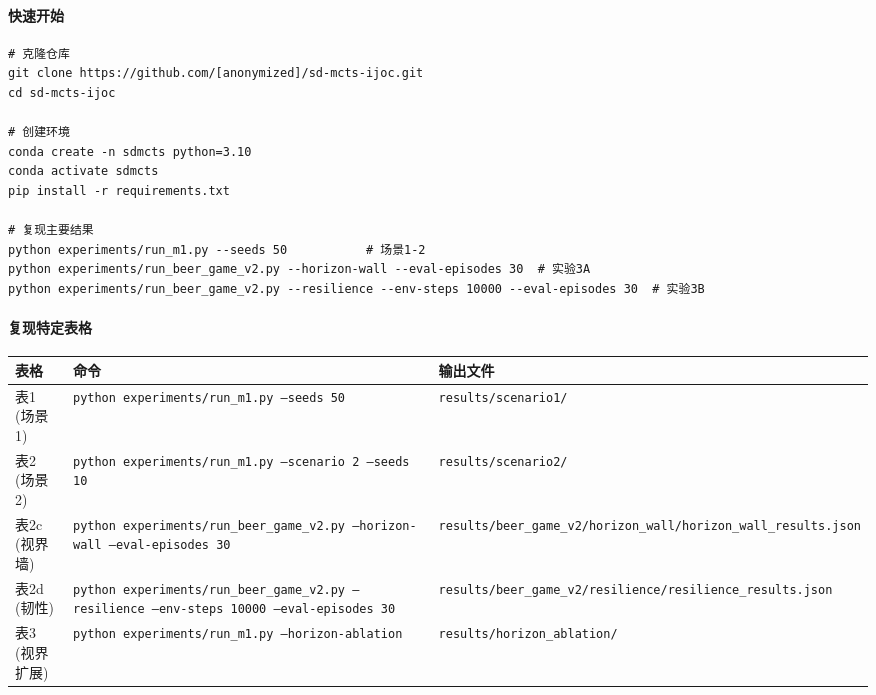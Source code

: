 \documentclass[UTF8]{ctexart}
\let\oldparagraph\paragraph
\renewcommand{\paragraph}[1]{\oldparagraph{#1}\mbox{}}
\begin{document}
\hypertarget{ux5febux901fux5f00ux59cb}{%
\paragraph{快速开始}\label{ux5febux901fux5f00ux59cb}}

\begin{verbatim}
# 克隆仓库
git clone https://github.com/[anonymized]/sd-mcts-ijoc.git
cd sd-mcts-ijoc

# 创建环境
conda create -n sdmcts python=3.10
conda activate sdmcts
pip install -r requirements.txt

# 复现主要结果
python experiments/run_m1.py --seeds 50           # 场景1-2
python experiments/run_beer_game_v2.py --horizon-wall --eval-episodes 30  # 实验3A
python experiments/run_beer_game_v2.py --resilience --env-steps 10000 --eval-episodes 30  # 实验3B
\end{verbatim}

\hypertarget{ux590dux73b0ux7279ux5b9aux8868ux683c}{%
\paragraph{复现特定表格}\label{ux590dux73b0ux7279ux5b9aux8868ux683c}}

\begin{table}[h]
\centering
\begin{tabular}{p{3cm}p{6cm}p{6cm}}
\toprule
\textbf{表格} & \textbf{命令} & \textbf{输出文件} \\
\midrule
表1 (场景1) & \texttt{python experiments/run\_m1.py --seeds 50} & \texttt{results/scenario1/} \\
表2 (场景2) & \texttt{python experiments/run\_m1.py --scenario 2 --seeds 10} & \texttt{results/scenario2/} \\
表2c (视界墙) & \texttt{python experiments/run\_beer\_game\_v2.py --horizon-wall --eval-episodes 30} & \texttt{results/beer\_game\_v2/horizon\_wall/horizon\_wall\_results.json} \\
表2d (韧性) & \texttt{python experiments/run\_beer\_game\_v2.py --resilience --env-steps 10000 --eval-episodes 30} & \texttt{results/beer\_game\_v2/resilience/resilience\_results.json} \\
表3 (视界扩展) & \texttt{python experiments/run\_m1.py --horizon-ablation} & \texttt{results/horizon\_ablation/} \\
\bottomrule
\end{tabular}
\end{table}
\end{document}
